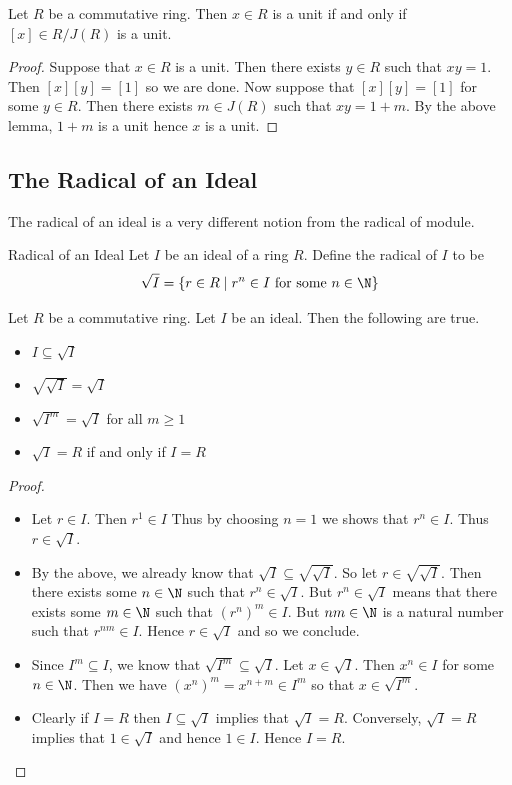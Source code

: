 \documentclass[a4paper]{article}
\begin{document}
\begin{lmm}{}{} Let $R$ be a commutative ring. Then $x\in R$ is a unit if and only if $[x]\in R/J(R)$ is a unit. 
\begin{proof}
Suppose that $x\in R$ is a unit. Then there exists $y\in R$ such that $xy=1$. Then $[x][y]=[1]$ so we are done. Now suppose that $[x][y]=[1]$ for some $y\in R$. Then there exists $m\in J(R)$ such that $xy=1+m$. By the above lemma, $1+m$ is a unit hence $x$ is a unit. 
\end{proof}
\end{lmm}

\subsection{The Radical of an Ideal}
The radical of an ideal is a very different notion from the radical of module. 

\begin{defn}{Radical of an Ideal}{} Let $I$ be an ideal of a ring $R$. Define the radical of $I$ to be $$\sqrt{I}=\{r\in R\;|\;r^n\in I\text{ for some }n\in\N\}$$
\end{defn}

\begin{prp}{}{} Let $R$ be a commutative ring. Let $I$ be an ideal. Then the following are true. 
\begin{itemize}
\item $I\subseteq\sqrt{I}$
\item $\sqrt{\sqrt{I}}=\sqrt{I}$
\item $\sqrt{I^m}=\sqrt{I}$ for all $m\geq 1$
\item $\sqrt{I}=R$ if and only if $I=R$
\end{itemize} 
\begin{proof}
\begin{itemize}
\item Let $r\in I$. Then $r^1\in I$ Thus by choosing $n=1$ we shows that $r^n\in I$. Thus $r\in\sqrt{I}$. 
\item By the above, we already know that $\sqrt{I}\subseteq\sqrt{\sqrt{I}}$. So let $r\in\sqrt{\sqrt{I}}$. Then there exists some $n\in\N$ such that $r^n\in\sqrt{I}$. But $r^n\in\sqrt{I}$ means that there exists some $m\in\N$ such that $(r^n)^m\in I$. But $nm\in\N$ is a natural number such that $r^{nm}\in I$. Hence $r\in\sqrt{I}$ and so we conclude. 
\item Since $I^m\subseteq I$, we know that $\sqrt{I^m}\subseteq\sqrt{I}$. Let $x\in\sqrt{I}$. Then $x^n\in I$ for some $n\in\N$. Then we have $(x^n)^m=x^{n+m}\in I^m$ so that $x\in\sqrt{I^m}$. 
\item Clearly if $I=R$ then $I\subseteq\sqrt{I}$ implies that $\sqrt{I}=R$. Conversely, $\sqrt{I}=R$ implies that $1\in\sqrt{I}$ and hence $1\in I$. Hence $I=R$. 
\end{itemize}
\end{proof}
\end{prp}
\end{document}
